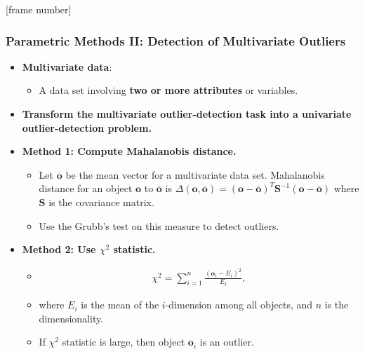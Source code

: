 \documentclass[aspectratio=169,t,xcolor=dvipsnames]{beamer}
\begin{document}
{
  [frame number]
  \begin{frame}
  	\frametitle{Parametric Methods II: Detection of Multivariate Outliers}
  	\begin{itemize}
  		\item \textbf{Multivariate data}:
  		      \begin{itemize}
  		      	\item A data set involving \textbf{\color{airforceblue}two or more attributes} or variables.
  		      \end{itemize}
  		\item \textbf{Transform the multivariate outlier-detection task into a univariate outlier-detection problem.}
  		\item \textbf{Method 1: Compute Mahalanobis distance.}
  		      \begin{itemize}
  		      	\item Let $\mathbf{\overline{o}}$ be the mean vector for a multivariate data set. Mahalanobis distance for an object $\mathbf{o}$ to $\mathbf{\overline{o}}$ is $\Delta(\mathbf{o}, \mathbf{\overline{o}}) = (\mathbf{o} - \mathbf{\overline{o}})^T \mathbf{S}^{-1} (\mathbf{o} - \mathbf{\overline{o}})$ where $\mathbf{S}$ is the covariance matrix.
  		      	\item Use the Grubb's test on this measure to detect outliers.
  		      \end{itemize}
  		\item \textbf{Method 2: Use $\chi^2$ statistic.}
            \begin{itemize}
              \item \vspace{-0.5cm}
                \begin{align}
                  \chi^2 = \sum^n_{i=1} \frac{(\mathbf{o}_i-E_i)^2}{E_i},
                \end{align}
  		      	\item where $E_i$ is the mean of the $i$-dimension among all objects, and $n$ is the dimensionality.
  		      	\item If $\chi^2$ statistic is large, then object $\mathbf{o}_i$ is an outlier.
  		      \end{itemize}
  	\end{itemize}
  \end{frame}
}
\end{document}
